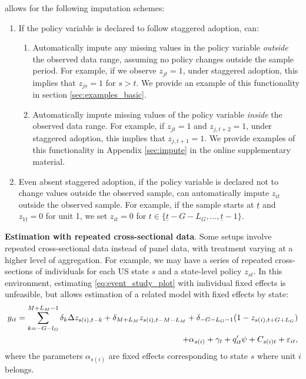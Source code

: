 \documentclass[12pt]{article}
\begin{document}
\xtevent allows for the following imputation schemes:
\begin{enumerate}
	\item If the policy variable is declared to follow staggered adoption, \xtevent can:
	\begin{enumerate}
		\item Automatically impute any missing values in the policy variable \textit{outside} the observed data range, assuming no policy changes outside the sample period.
		For example, if we observe $z_{jt}=1$, under staggered adoption, this implies that $z_{js}=1$ for $s>t$.
		We provide an example of this functionality in section \ref{sec:examples_basic}.
		\item Automatically impute missing values of the policy variable \textit{inside} the observed data range. For example, if $z_{jt} = 1$ and $z_{j,t+2} = 1$, under staggered adoption, this implies that $z_{j,t+1} = 1$. We provide examples of this functionality in Appendix \ref{sec:impute} in the online supplementary material.
	\end{enumerate}
	\item
	Even absent staggered adoption, if the policy variable is declared not to change values outside the observed sample, \xtevent can automatically impute $z_{it}$ outside the observed sample.
	For example, if the sample starts at $\underline{t}$ and $z_{1\underline{t}} = 0$ for unit 1, we set $z_{it} = 0$ for $t \in \{ \underline{t} - G - L_G, ..., \underline{t}-1 \}$.
\end{enumerate}


\noindent \textbf{Estimation with repeated cross-sectional data}. Some setups involve repeated cross-sectional data instead of panel data, with treatment varying at a higher level of aggregation. For example, we may have a series of repeated cross-sections of individuals for each US state $s$ and a state-level policy $z_{st}$. In this environment, estimating \eqref{eq:event_study_plot} with individual fixed effects is unfeasible, but \xtevent allows estimation of a related model with fixed effects by state:
\begin{equation}\label{eq:repeatedcs}
\begin{split}
y_{it} = \sum_{k=-G-l_G}^{M+L_M -1}\delta_k \Delta  z_{s(i),t-k} + \delta_{M+L_M} z_{s(i),t-M-L_M} + \delta_{-G-L_G-1}(1-z_{s(i),t+G+L_G})
\\ \centering
+ \alpha_{s(i)} + \gamma_{t} + q'_{it}\psi + C_{s(i)t} + \varepsilon_{it},
\end{split}
\end{equation}
where the parameters $\alpha_{s(i)}$ are fixed effects corresponding to state $s$ where unit $i$ belongs.
\end{document}
